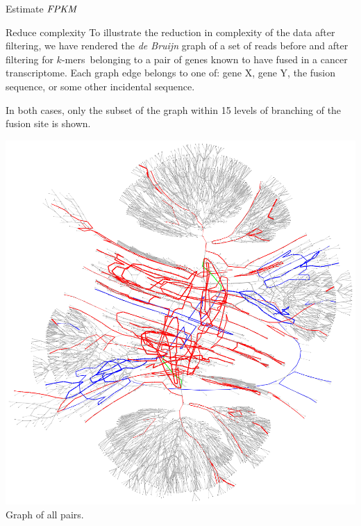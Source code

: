 \documentclass[a0paper,portrait]{baposter}
\newcommand{\kmers}{$k$-mers\ }
\newcommand{\fpkm}{\ensuremath{\hbox{\textit{FPKM}}}\ }
\begin{document}
\begin{poster}
\begin{posterbox}[name=fpkm,column=0,below=filtering]{Estimate \fpkm}
\end{posterbox}

\begin{posterbox}[name=graphs,column=1,row=0]{Reduce complexity}
To illustrate the reduction in complexity of the data after filtering, we have rendered the \textit{de Bruijn} graph of 
a set of reads before and after filtering for \kmers belonging to a pair of genes known to have fused in a cancer transcriptome.
Each graph edge belongs to one of: \textcolor{graphblue}{gene X}, \textcolor{graphred}{gene Y}, the \textcolor{graphgreen}{fusion sequence}, or some other incidental sequence.

In both cases, only the subset of the graph within 15 levels of branching of the fusion site is shown.

\vspace{1.0em}
\begin{center}
\includegraphics[width=0.9\linewidth]{all-t1-r15lp}
\footnotesize
Graph of all pairs.
\end{center}


\end{posterbox}
\end{poster}
\end{document}
